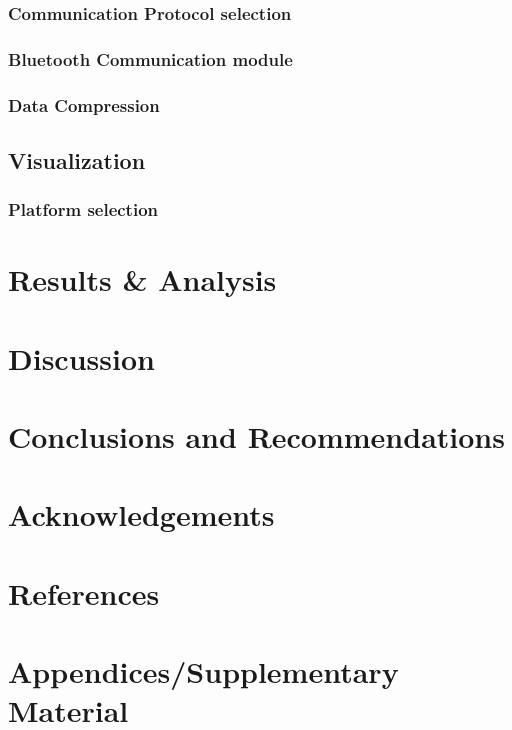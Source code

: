 \subsubsection{Communication Protocol selection}

\subsubsection{Bluetooth Communication module}


\subsubsection{Data Compression}




\subsection{Visualization}
\subsubsection{Platform selection}





\section{Results \& Analysis}


\section{Discussion}


\section{Conclusions and Recommendations}


\section{Acknowledgements }


\section{References}


\printbibliography[heading=none]


\section{Appendices/Supplementary Material}



